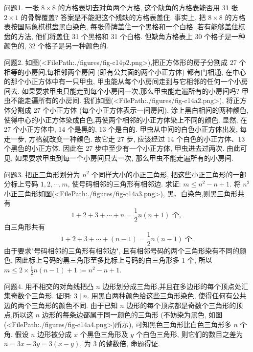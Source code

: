
问题1. 一张 $8 \times 8$ 的方格表切去对角两个方格, 这个缺角的方格表能否用 31 张 $2 \times 1$ 的骨牌覆盖?
答案是不能把这个残缺的方格表盖住.
事实上, 把 $8 \times 8$ 的方格表按国际象棋棋盘黑白染色, 每张骨牌盖住一个黑格和一个白格.
若有能够盖住棋盘的方法, 他们将盖住 31 个黑格和 31 个白格.
但缺角方格表上 30 个格子是一种颜色的, 32 个格子是另一种颜色的.



问题2. 如图(<FilePath:./figures/fig-c14p2.png>),把正方体形的房子分割成 27 个相等的小房间,每相邻两个房间 (即有公共面的两个小正方体) 都有门相通, 在中心的那个小正方体中有一只甲虫, 甲虫能从每个小房间走到与它相邻的任何一个小房间去.
如果要求甲虫只能走到每个小房间一次,那么甲虫能走遍所有的小房间吗?
甲虫不能走遍所有的小房间.
我们如图(<FilePath:./figures/fig-c14a2.png>), 将正方体分割成 27 个小正方体 (每个小正方体表示一间房间), 涂上黑白相间的两种颜色, 使得中心的小正方体染成白色,再使两个相邻的小正方体染上不同的颜色.
显然, 在 27 个小正方体中, 14 个是黑的, 13 个是白的.
甲虫从中间的白色小正方体出发, 每走一步, 方格就改变一种颜色.
故它走 27 步, 应该经过 14 个白色的小正方体、13 个黑色的小正方体.
因此在 27 步中至少有一个小正方体, 甲虫进去过两次.
由此可见, 如果要求甲虫到每一个小房间只去一次, 那么甲虫不能走遍所有的小房间.



问题3. 把正三角形划分为 $n^2$ 个同样大小的小正三角形, 把这些小正三角形的一部分标上号码 $1,2, \cdots, m$, 使号码相邻的三角形有相邻边.
求证: $m \leqslant n^2-n+1$.
将 $n^2$ 小正三角形如图(<FilePath:./figures/fig-c14a3.png>), 黑、白染色,则黑三角形共有
$$
1+2+3+\cdots+n=\frac{1}{2} n(n+1) \text { 个, }
$$
白三角形共有
$$
1+2+3+\cdots+(n-1)=\frac{1}{2} n(n-1) \text { 个.
}
$$
由于要求"号码相邻的三角形有相邻边", 且有相邻号码的两个三角形染有不同的颜色, 因此标上号码的黑三角形至多比标上号码的白三角形多 1 个, 所以 $m \leqslant 2 \times \frac{1}{2} n(n-1)+1:=n^2-n+1$.



问题4. 用不相交的对角线把凸 $n$ 边形划分成三角形,并且在多边形的每个顶点处汇集奇数个三角形.
证明: $3 \mid n$.
用黑白两种颜色给这些三角形染色, 使得任何有公共边的两个三角形的颜色不同.
由于已知 $n$ 边形的每个顶点都是奇数个三角形的顶点,所以这 $n$ 边形的每条边都属于同一颜色的三角形 (不妨染为黑色, 如图(<FilePath:./figures/fig-c14a4.png>)所示), 可知黑色三角形比白色三角形多 $n$ 个角.
假设 $n$ 边形被分成 $x$ 个黑色三角形及 $y$ 个白色三角形, 则它们的数目之差为 $n=3 x-3 y=3(x-y)$, 为 3 的整数倍, 命题得证.



